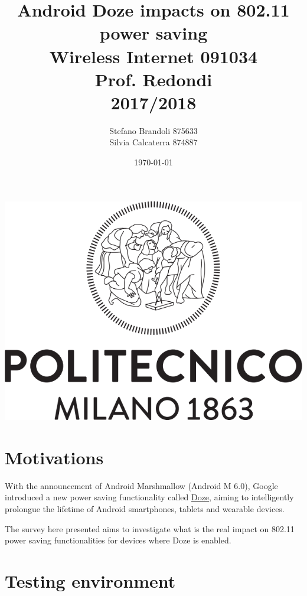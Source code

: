 \documentclass[11pt, a4paper]{article}
\begin{document}
    \title{%
	Android Doze impacts on 802.11 power saving \\
	\large Wireless Internet 091034\\
	Prof. Redondi\\
	2017/2018}

    \author{Stefano Brandoli 875633\\Silvia Calcaterra 874887}
    \date{\today}

	\maketitle
	\begin{center}
	    \includegraphics[scale=0.3]{Logo_Politecnico_Milano.png}
	\end{center}
	\newpage
	\tableofcontents
	\newpage
	
	\section{Motivations}
	With the announcement of Android Marshmallow (Android M 6.0), Google introduced a new power saving functionality called \href{https://android.hdblog.it/2015/06/02/android-m-funzionamento-di-doze/}{Doze}, aiming to intelligently prolongue the lifetime of Android smartphones, tablets and wearable devices.
	
	The survey here presented aims to investigate what is the real impact on 802.11 power saving functionalities for devices where Doze is enabled.
	
	\section{Testing environment}
\end{document}
